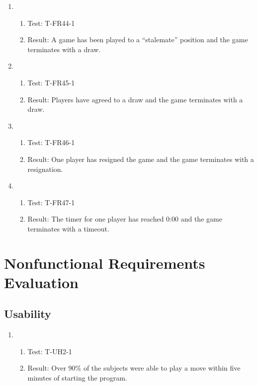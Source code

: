 \documentclass[12pt, titlepage]{article}
\begin{document}
\begin{enumerate}[\indent {}]
        \item 
            \begin{enumerate}[ ]
                \item Test: T-FR44-1
                \item Result: A game has been played to a ``stalemate'' position and the game terminates with a draw.
            \end{enumerate}
            
        \item 
            \begin{enumerate}[ ]
                \item Test: T-FR45-1
                \item Result: Players have agreed to a draw and the game terminates with a draw.
            \end{enumerate}
            
        \item 
            \begin{enumerate}[ ]
                \item Test: T-FR46-1
                \item Result: One player has resigned the game and the game terminates with a resignation.
            \end{enumerate}
            
        \item 
            \begin{enumerate}[ ]
                \item Test: T-FR47-1
                \item Result: The timer for one player has reached 0:00 and the game terminates with a timeout.
            \end{enumerate}
    \end{enumerate}

\section{Nonfunctional Requirements Evaluation}
    \subsection{Usability}
        \begin{enumerate}
                \item 
                    \begin{enumerate}[ ]
                        \item Test: T-UH2-1
                        \item Result: Over 90\% of the subjects were able to play a move within five minutes of starting the program.
                    \end{enumerate}
        \end{enumerate}
\end{document}

